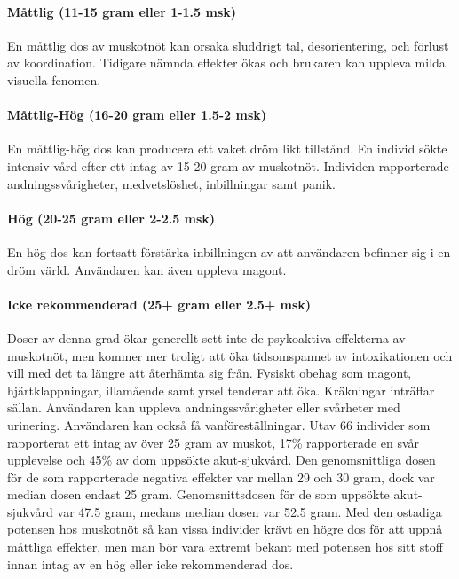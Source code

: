 \paragraph{Måttlig (11-15 gram eller 1-1.5 msk)}
En måttlig dos av muskotnöt kan orsaka sluddrigt tal, desorientering, och förlust av koordination. Tidigare nämnda effekter ökas och brukaren kan uppleva milda visuella fenomen.

\paragraph{Måttlig-Hög (16-20 gram eller 1.5-2 msk)}
En måttlig-hög dos kan producera ett vaket dröm likt tillstånd. En individ sökte intensiv vård efter ett intag av 15-20 gram av muskotnöt. Individen rapporterade andningssvårigheter, medvetslöshet, inbillningar samt panik.

\paragraph{Hög (20-25 gram eller 2-2.5 msk)}
En hög dos kan fortsatt förstärka inbillningen av att användaren befinner sig i en dröm värld. Användaren kan även uppleva magont.

\paragraph{Icke rekommenderad (25+ gram eller 2.5+ msk)}
Doser av denna grad ökar generellt sett inte de psykoaktiva effekterna av muskotnöt, men kommer mer troligt att öka tidsomspannet av intoxikationen och vill med det ta längre att återhämta sig från.
Fysiskt obehag som magont, hjärtklappningar, illamående samt yrsel tenderar att öka.
Kräkningar inträffar sällan.
Användaren kan uppleva andningssvårigheter eller svårheter med urinering. Användaren kan också få vanföreställningar.
Utav 66 individer som rapporterat ett intag av över 25 gram av muskot, 17\% rapporterade en svår upplevelse och 45\% av dom uppsökte akut-sjukvård.
Den genomsnittliga dosen för de som rapporterade negativa effekter var mellan 29 och 30 gram, dock var median dosen endast 25 gram. Genomsnittsdosen för de som uppsökte akut-sjukvård var 47.5 gram, medans median dosen var 52.5 gram. Med den ostadiga potensen hos muskotnöt så kan vissa individer krävt en högre dos för att uppnå måttliga effekter, men man bör vara extremt bekant med potensen hos sitt stoff innan intag av en hög eller icke rekommenderad dos.









